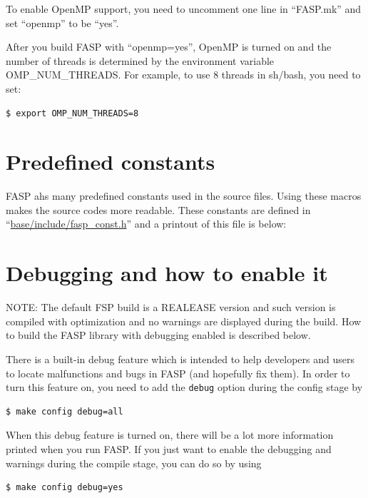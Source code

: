 \documentclass[11pt]{memoir}
\begin{document}
To enable OpenMP support, you need to uncomment one line in ``FASP.mk'' and set ``openmp'' to be ``yes''.


After you build FASP with ``openmp=yes'', OpenMP is turned on and the number of threads is determined by the environment variable OMP\_NUM\_THREADS. For example, to use 8 threads in {\color{red} sh/bash}, you need to set:
\begin{lstlisting}[numbers=none]
$ export OMP_NUM_THREADS=8
\end{lstlisting}

\section{Predefined constants}\label{sec:const}

FASP ahs many predefined constants used in the source files. 
Using these macros makes the source codes more readable. 
These constants are defined in ``\url{base/include/fasp\_const.h}''
and a printout of this file is below:
%


\section{Debugging and how to enable it}\label{sec:debug}

\begin{snugshade}\noindent
  NOTE: The default FSP build is a REALEASE version and such version
  is compiled with optimization and no warnings are displayed during
  the build. How to build the FASP library with debugging enabled is
  described below.
\end{snugshade}
%
There is a built-in debug feature which is intended to help developers
and users to locate malfunctions and bugs in FASP (and hopefully fix
them). In order to turn this feature on, you need to add the
\verb|debug| option during the config stage by
%
\begin{lstlisting}[numbers=none]
$ make config debug=all
\end{lstlisting}
%
When this debug feature is turned on, there will be a lot more
information printed when you run FASP.  If you just want to enable the
debugging and warnings during the compile stage, you can do so by
using
%
\begin{lstlisting}[numbers=none]
$ make config debug=yes
\end{lstlisting}
%
\end{document}
